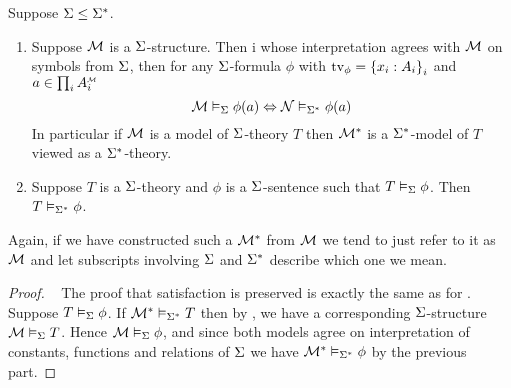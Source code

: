 \begin{lem} 
    Suppose $\Sigma \leq \Sigma^*$.
    \begin{enumerate}
        \item Suppose $\mathcal{M}$ is a $\Sigma$-structure.
            Then i
            whose interpretation agrees with $\mathcal{M}$
            on symbols from $\Sigma$,
            then for any $\Sigma$-formula $\phi$ 
            with $\textrm{tv}_{\phi} = \left\{x_i : A_i\right\}_i$ and 
            $a \in \prod_i \mmintp{A_i}$
            \[\mathcal{M} \vDash_{\Sigma} \phi(a) \Leftrightarrow \mathcal{N} \vDash_{\Sigma^*} \phi(a)\]
            In particular if $\mathcal{M}$ is a model of $\Sigma$-theory $T$ then 
            $\mathcal{M}^*$ is a $\Sigma^*$-model of $T$ viewed as a $\Sigma^*$-theory.
        \item Suppose $T$ is a $\Sigma$-theory and $\phi$ is a 
            $\Sigma$-sentence such that $T \vDash_{\Sigma} \phi$.
            Then $T \vDash_{\Sigma^*} \phi$.
    \end{enumerate}
    Again, if we have constructed such a $\mathcal{M}^*$ from $\mathcal{M}$
    we tend to just refer to it as $\mathcal{M}$ and let subscripts involving 
    $\Sigma$ and $\Sigma^*$ describe which one we mean.
\end{lem}
\begin{proof}~
    The proof that satisfaction is preserved is exactly the same as for 
    .
    Suppose $T \vDash_{\Sigma} \phi$.
    If $\mathcal{M}^* \vDash_{\Sigma^*} T$ then by 
    ,
    we have a corresponding $\Sigma$-structure $\mathcal{M} \vDash_{\Sigma} T$.
    Hence $\mathcal{M} \vDash_{\Sigma} \phi$, and
    since both models agree on interpretation
    of constants, functions and relations of $\Sigma$ we have
    $\mathcal{M}^* \vDash_{\Sigma^*} \phi$ by the previous part.
\end{proof}

